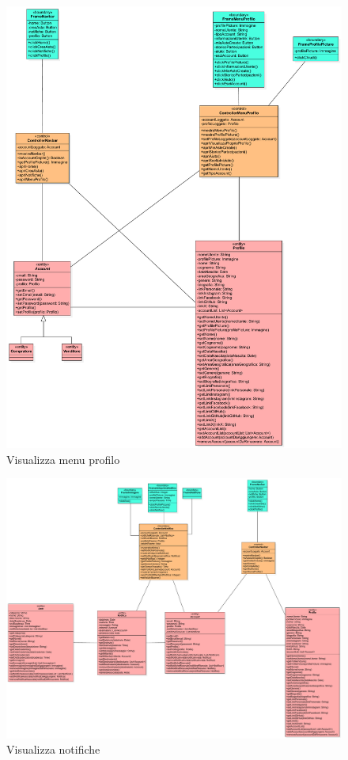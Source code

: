             \begin{figure}[htbp!]
                \centering
                    \includegraphics[width=1\linewidth]{Immagini/Diagrammi/Class Diagram/Utente che ha effettuato l'accesso/VisualizzaMenuProfilo.pdf}
                \caption{Visualizza menu profilo}
            \end{figure}
            
            \begin{figure}[htbp!]
                \centering
                    \includegraphics[width=1\linewidth]{Immagini/Diagrammi/Class Diagram/Utente che ha effettuato l'accesso/VisualizzaNotifiche.pdf}
                \caption{Visualizza notifiche}
            \end{figure}
            
